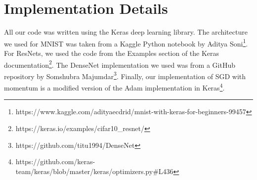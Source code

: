 \documentclass{article}
\begin{document}



\appendix
\section{Implementation Details} \label{appendix:A}
All our code was written using the Keras deep learning library. The architecture we used for MNIST was taken from a Kaggle Python notebook by Aditya Soni\footnote{https://www.kaggle.com/adityaecdrid/mnist-with-keras-for-beginners-99457}. For ResNets, we used the code from the Examples section of the Keras documentation\footnote{https://keras.io/examples/cifar10\_resnet/}. The DenseNet implementation we used was from a GitHub repository by Somshubra Majumdar\footnote{https://github.com/titu1994/DenseNet}. Finally, our implementation of SGD with momentum is a modified version of the Adam implementation in Keras\footnote{https://github.com/keras-team/keras/blob/master/keras/optimizers.py\#L436}.
\end{document}
